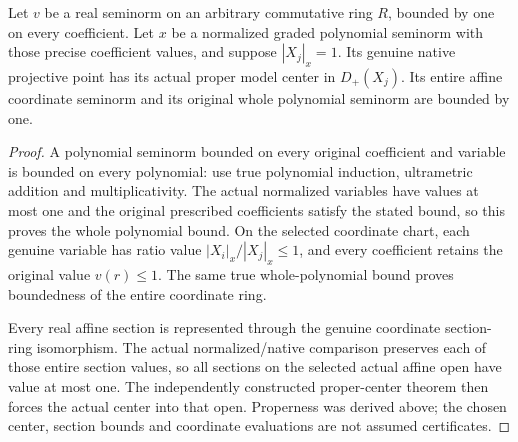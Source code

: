 \begin{theorem}
\label{projective:native-normalized-value-one-center}
\leanok
{}
Let $v$ be a real seminorm on an arbitrary commutative ring $R$, bounded
by one on every coefficient. Let $x$ be a normalized graded polynomial
seminorm with those precise coefficient values, and suppose
$|X_j|_x=1$. Its genuine native projective point has its actual proper
model center in $D_+(X_j)$. Its entire affine coordinate seminorm and
its original whole polynomial seminorm are bounded by one.
\end{theorem}
\begin{proof}
A polynomial seminorm bounded on every original coefficient and variable
is bounded on every polynomial: use true polynomial induction,
ultrametric addition and multiplicativity. The actual normalized
variables have values at most one and the original prescribed coefficients
satisfy the stated bound, so this proves the whole polynomial bound.
On the selected coordinate chart, each genuine variable has ratio value
$|X_i|_x/|X_j|_x\le1$, and every coefficient retains the original value
$v(r)\le1$. The same true whole-polynomial bound proves boundedness of
the entire coordinate ring.

Every real affine section is represented through the genuine coordinate
section-ring isomorphism. The actual normalized/native comparison
preserves each of those entire section values, so all sections on the
selected actual affine open have value at most one. The independently
constructed proper-center theorem then forces the actual center into
that open. Properness was derived above; the chosen center, section
bounds and coordinate evaluations are not assumed certificates.
\end{proof}

